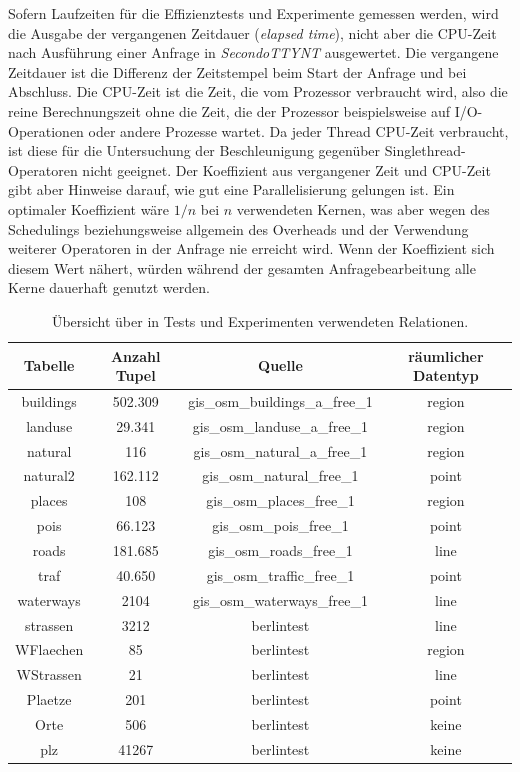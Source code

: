 \documentclass[a4paper,12pt,twoside]{article}
\newcommand{\Fb}[1]{\textit{#1}} %
\begin{document}
Sofern Laufzeiten für die Effizienztests und Experimente gemessen werden, wird die Ausgabe der vergangenen Zeitdauer (\Fb{elapsed time}), nicht aber die CPU-Zeit nach Ausführung einer Anfrage in \Fb{SecondoTTYNT} ausgewertet. Die vergangene Zeitdauer ist die Differenz der Zeitstempel beim Start der Anfrage und bei Abschluss. Die CPU-Zeit ist die Zeit, die vom Prozessor verbraucht wird, also die reine Berechnungszeit ohne die Zeit, die der Prozessor beispielsweise auf I/O-Operationen oder andere Prozesse wartet. Da jeder Thread CPU-Zeit verbraucht, ist diese für die Untersuchung der Beschleunigung gegenüber Singlethread-Operatoren nicht geeignet. Der Koeffizient aus vergangener Zeit und CPU-Zeit gibt aber Hinweise darauf, wie gut eine Parallelisierung gelungen ist. Ein optimaler Koeffizient wäre $1 / n$ bei $n$ verwendeten Kernen, was aber wegen des Schedulings beziehungsweise allgemein des Overheads und der Verwendung weiterer Operatoren in der Anfrage nie erreicht wird. Wenn der Koeffizient sich diesem Wert nähert, würden während der gesamten Anfragebearbeitung alle Kerne dauerhaft genutzt werden.

\begin{table}
	\centering
\begin{tabular}{|c|c|c|c|}
	\hline
	\rowcolor{gray!30}
	Tabelle & Anzahl Tupel & Quelle & räumlicher Datentyp  \\ 
	\hline 
	buildings & 502.309 & gis\_osm\_buildings\_a\_free\_1 & region \\ 
	\hline 
	landuse & 29.341 & gis\_osm\_landuse\_a\_free\_1 & region \\ 
	\hline 
	natural & 116 & gis\_osm\_natural\_a\_free\_1 & region \\ 
	\hline 
	natural2 & 162.112 & gis\_osm\_natural\_free\_1 & point \\ 
	\hline
	places & 108 & gis\_osm\_places\_free\_1 & region \\ 
	\hline 
	pois & 66.123 & gis\_osm\_pois\_free\_1  & point \\ 
	\hline 
	roads & 181.685 & gis\_osm\_roads\_free\_1 & line \\ 
	\hline
	traf & 40.650 & gis\_osm\_traffic\_free\_1  & point \\ 
	\hline 
	waterways & 2104 & gis\_osm\_waterways\_free\_1 & line \\ 
	\hline
	strassen & 3212 &  berlintest & line \\ 
	\hline
	WFlaechen & 85 &  berlintest & region \\ 
	\hline 
	WStrassen & 21 &  berlintest & line \\ 
	\hline 
	Plaetze & 201 &  berlintest & point \\ 
	\hline 
	Orte & 506 & berlintest & keine \\ 
	\hline
	plz & 41267 & berlintest & keine \\ 
	\hline 
\end{tabular}
\caption{\label{tab:testRel} Übersicht über in Tests und Experimenten verwendeten Relationen.}
\end{table}
\end{document}

